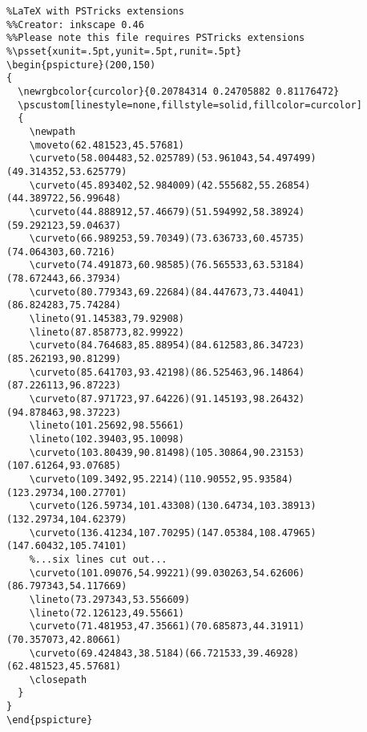 \documentclass[12pt,mathserif]{beamer}
\begin{document}
\begin{frame}[fragile]
\tiny
\begin{verbatim}
%LaTeX with PSTricks extensions
%%Creator: inkscape 0.46
%%Please note this file requires PSTricks extensions
%\psset{xunit=.5pt,yunit=.5pt,runit=.5pt}
\begin{pspicture}(200,150)
{
  \newrgbcolor{curcolor}{0.20784314 0.24705882 0.81176472}
  \pscustom[linestyle=none,fillstyle=solid,fillcolor=curcolor]
  {
    \newpath
    \moveto(62.481523,45.57681)
    \curveto(58.004483,52.025789)(53.961043,54.497499)(49.314352,53.625779)
    \curveto(45.893402,52.984009)(42.555682,55.26854)(44.389722,56.99648)
    \curveto(44.888912,57.46679)(51.594992,58.38924)(59.292123,59.04637)
    \curveto(66.989253,59.70349)(73.636733,60.45735)(74.064303,60.7216)
    \curveto(74.491873,60.98585)(76.565533,63.53184)(78.672443,66.37934)
    \curveto(80.779343,69.22684)(84.447673,73.44041)(86.824283,75.74284)
    \lineto(91.145383,79.92908)
    \lineto(87.858773,82.99922)
    \curveto(84.764683,85.88954)(84.612583,86.34723)(85.262193,90.81299)
    \curveto(85.641703,93.42198)(86.525463,96.14864)(87.226113,96.87223)
    \curveto(87.971723,97.64226)(91.145193,98.26432)(94.878463,98.37223)
    \lineto(101.25692,98.55661)
    \lineto(102.39403,95.10098)
    \curveto(103.80439,90.81498)(105.30864,90.23153)(107.61264,93.07685)
    \curveto(109.3492,95.2214)(110.90552,95.93584)(123.29734,100.27701)
    \curveto(126.59734,101.43308)(130.64734,103.38913)(132.29734,104.62379)
    \curveto(136.41234,107.70295)(147.05384,108.47965)(147.60432,105.74101)
    %...six lines cut out...
    \curveto(101.09076,54.99221)(99.030263,54.62606)(86.797343,54.117669)
    \lineto(73.297343,53.556609)
    \lineto(72.126123,49.55661)
    \curveto(71.481953,47.35661)(70.685873,44.31911)(70.357073,42.80661)
    \curveto(69.424843,38.5184)(66.721533,39.46928)(62.481523,45.57681)
    \closepath
  }
}
\end{pspicture}
\end{verbatim}
\end{frame}
\end{document}
